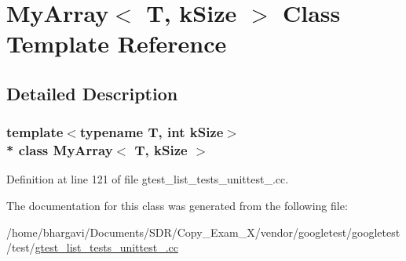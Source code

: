 \hypertarget{class_my_array}{}\section{My\+Array$<$ T, k\+Size $>$ Class Template Reference}
\label{class_my_array}


\subsection{Detailed Description}
\subsubsection*{template$<$typename T, int k\+Size$>$\\*
class My\+Array$<$ T, k\+Size $>$}



Definition at line 121 of file gtest\+\_\+list\+\_\+tests\+\_\+unittest\+\_\+.\+cc.



The documentation for this class was generated from the following file\+:\begin{DoxyCompactItemize}
\item 
/home/bhargavi/\+Documents/\+S\+D\+R/\+Copy\+\_\+\+Exam\+\_\+X/vendor/googletest/googletest/test/\hyperlink{gtest__list__tests__unittest___8cc}{gtest\+\_\+list\+\_\+tests\+\_\+unittest\+\_\+.\+cc}\end{DoxyCompactItemize}
